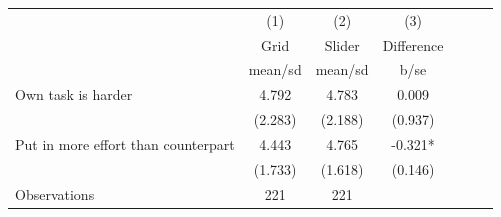 {
\def\sym#1{\ifmmode^{#1}\else\(^{#1}\)\fi}
\begin{tabular}{l*{3}{cc}}
\hline\hline
                    &\multicolumn{1}{c}{(1)}&\multicolumn{1}{c}{(2)}&\multicolumn{1}{c}{(3)}\\
                    &\multicolumn{1}{c}{Grid}&\multicolumn{1}{c}{Slider}&\multicolumn{1}{c}{Difference}\\
                    &     mean/sd&     mean/sd&        b/se   \\
\hline
Own task is harder  &       4.792&       4.783&       0.009   \\
                    &     (2.283)&     (2.188)&     (0.937)   \\
Put in more effort than counterpart&       4.443&       4.765&      -0.321*  \\
                    &     (1.733)&     (1.618)&     (0.146)   \\
\hline
Observations        &         221&         221&               \\
\hline\hline
\end{tabular}
}
